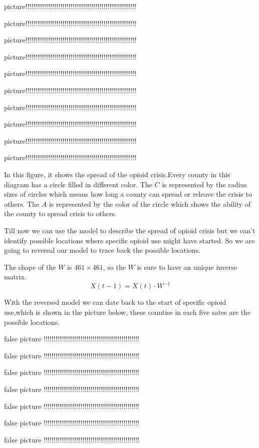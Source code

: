 \documentclass{mcmthesis}
\begin{document}
	\par picture!!!!!!!!!!!!!!!!!!!!!!!!!!!!!!!!!!!!!!!!!!!!!!!!!!!!!!!!!
	\par picture!!!!!!!!!!!!!!!!!!!!!!!!!!!!!!!!!!!!!!!!!!!!!!!!!!!!!!!!!
	\par picture!!!!!!!!!!!!!!!!!!!!!!!!!!!!!!!!!!!!!!!!!!!!!!!!!!!!!!!!!
	\par picture!!!!!!!!!!!!!!!!!!!!!!!!!!!!!!!!!!!!!!!!!!!!!!!!!!!!!!!!!
	\par picture!!!!!!!!!!!!!!!!!!!!!!!!!!!!!!!!!!!!!!!!!!!!!!!!!!!!!!!!!
	\par picture!!!!!!!!!!!!!!!!!!!!!!!!!!!!!!!!!!!!!!!!!!!!!!!!!!!!!!!!!
	\par picture!!!!!!!!!!!!!!!!!!!!!!!!!!!!!!!!!!!!!!!!!!!!!!!!!!!!!!!!!
	\par picture!!!!!!!!!!!!!!!!!!!!!!!!!!!!!!!!!!!!!!!!!!!!!!!!!!!!!!!!!
	\par picture!!!!!!!!!!!!!!!!!!!!!!!!!!!!!!!!!!!!!!!!!!!!!!!!!!!!!!!!!
	\par picture!!!!!!!!!!!!!!!!!!!!!!!!!!!!!!!!!!!!!!!!!!!!!!!!!!!!!!!!!

	\par In this figure, it shows the spread of the opioid crisis.Every county in this diagram has a circle filled in different color. The $C$ is represented by the radius sizes of circles which means how long a county can spread or releave the crisis to others. The $A$ is represented by the color of the circle which shows the ability of the county to spread crisis to others.
	\par Till now we can use the model to describe the spread of opioid crisis
	but we can't identify possible locations where specific opioid use might have started. So we are going to reversal our model to trace back the possible locations. 
	
	The shape of the $W$ is $461 \times 461$, so the $W$ is sure to have an unique inverse matrix.
	$$
	X(t-1) = X(t) \cdot W^{-1}
	$$  
	
	
	\par With the reversed model we can date back to the start of specific opioid use,which is shown in the picture below, these countise in each five sates are the possible locations.
	\par false picture !!!!!!!!!!!!!!!!!!!!!!!!!!!!!!!!!!!!!!!!!!!!!!!!!
	\par false picture !!!!!!!!!!!!!!!!!!!!!!!!!!!!!!!!!!!!!!!!!!!!!!!!!
	\par false picture !!!!!!!!!!!!!!!!!!!!!!!!!!!!!!!!!!!!!!!!!!!!!!!!!
	\par false picture !!!!!!!!!!!!!!!!!!!!!!!!!!!!!!!!!!!!!!!!!!!!!!!!!
	\par false picture !!!!!!!!!!!!!!!!!!!!!!!!!!!!!!!!!!!!!!!!!!!!!!!!!
	\par false picture !!!!!!!!!!!!!!!!!!!!!!!!!!!!!!!!!!!!!!!!!!!!!!!!!
	\par false picture !!!!!!!!!!!!!!!!!!!!!!!!!!!!!!!!!!!!!!!!!!!!!!!!!
	
\end{document}
